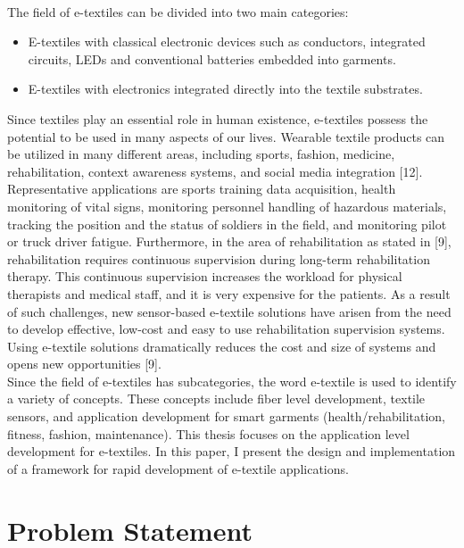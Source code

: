 \\
The field of e-textiles can be divided into two main categories:
\begin{itemize}

\item E-textiles with classical electronic devices such as conductors, integrated circuits, LEDs and conventional batteries embedded into garments.
\item E-textiles with electronics integrated directly into the textile substrates.

\end{itemize}

Since textiles play an essential role in human existence, e-textiles possess the potential to be used in many aspects of our lives. Wearable textile products can be utilized in many different areas, including sports, fashion, medicine, rehabilitation, context awareness systems, and social media integration [12]. Representative applications are sports training data acquisition, health monitoring of vital signs, monitoring personnel handling of hazardous materials, tracking the position and the status of soldiers in the field, and monitoring pilot or truck driver fatigue. Furthermore, in the area of rehabilitation as stated in [9], rehabilitation requires continuous supervision during long-term rehabilitation therapy. This continuous supervision increases the workload for physical therapists and medical staff, and it is very expensive for the patients. As a result of such challenges, new sensor-based e-textile solutions have arisen from the need to develop effective, low-cost and easy to use rehabilitation supervision systems. Using e-textile solutions dramatically reduces the cost and size of systems and opens new opportunities [9]. 
\\
Since the field of e-textiles has subcategories, the word e-textile is used to identify a variety of concepts. These concepts include fiber level development, textile sensors, and application development for smart garments (health/rehabilitation, fitness, fashion, maintenance). This thesis focuses on the application level development for e-textiles. In this paper, I present the design and implementation of a framework for rapid development of e-textile applications. 
\\

\section{Problem Statement}

